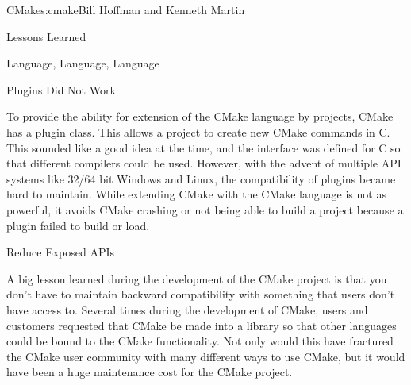 \begin{aosachapter}{CMake}{s:cmake}{Bill Hoffman and Kenneth Martin}
\begin{aosasect1}{Lessons Learned}
\begin{aosasect2}{Language, Language, Language}
\end{aosasect2}

\begin{aosasect2}{Plugins Did Not Work}

To provide the ability for extension of the CMake language by
projects, CMake has a plugin class. This allows a project to create
new CMake commands in C. This sounded like a good idea at
the time, and the interface was defined for C so that different
compilers could be used. However, with the advent of multiple API
systems like 32/64 bit Windows and Linux, the compatibility of plugins
became hard to maintain. While extending CMake with the CMake language
is not as powerful, it avoids CMake crashing or not being able
to build a project because a plugin failed to build or load.

\end{aosasect2}

\begin{aosasect2}{Reduce Exposed APIs}

A big lesson learned during the development of the CMake project is
that you don't have to maintain backward compatibility with something
that users don't have access to. Several times during the development
of CMake, users and customers requested that CMake be made into a
library so that other languages could be bound to the CMake
functionality. Not only would this have fractured the CMake user
community with many different ways to use CMake, but it would have
been a huge maintenance cost for the CMake project.

\end{aosasect2}

\end{aosasect1}

\end{aosachapter}
